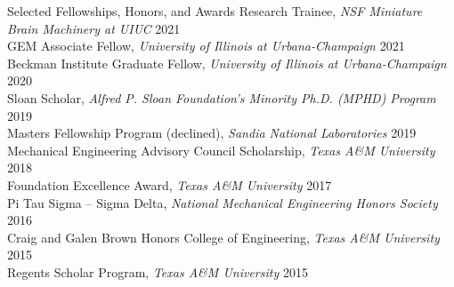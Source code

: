 \documentclass[11pt]{resume} %
\begin{document}
\begin{rSection}{Selected Fellowships, Honors, and Awards}
    Research Trainee, \textit{NSF Miniature Brain Machinery at UIUC} \hfill 2021\\
    GEM Associate Fellow, \textit{University of Illinois at Urbana-Champaign} \hfill 2021\\
    Beckman Institute Graduate Fellow, \textit{University of Illinois at Urbana-Champaign} \hfill 2020\\
    Sloan Scholar, \textit{Alfred P. Sloan Foundation's Minority Ph.D. (MPHD) Program} \hfill 2019\\
    Masters Fellowship Program (declined), \textit{Sandia National Laboratories} \hfill 2019\\
    Mechanical Engineering Advisory Council Scholarship, \textit{Texas A\&M University} \hfill 2018\\
    Foundation Excellence Award, \textit{Texas A\&M University} \hfill 2017\\
    Pi Tau Sigma -- Sigma Delta, \textit{National Mechanical Engineering Honors Society} \hfill 2016\\
    Craig and Galen Brown Honors College of Engineering, \textit{Texas A\&M University} \hfill 2015\\
    Regents Scholar Program, \textit{Texas A\&M University} \hfill 2015
\end{rSection}

\end{document}
